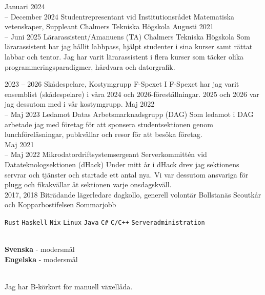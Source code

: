 \documentclass[9pt]{developercv}
\begin{document}
\begin{entrylist}
	\entry
		{Januari 2024 \\-- December 2024}
		{
			Studentrepresentant vid Institutionsrådet Matematiska\\vetenskaper, Suppleant
		}
		{Chalmers Tekniska Högskola}
		{}
	\entry
		{Augusti 2021 \\--  Juni 2025}
		{Lärarassistent/Amanuens (TA)}
		{Chalmers Tekniska Högskola}
		{
			Som lärarassistent har jag hållit labbpass, hjälpt studenter
			i sina kurser samt rättat labbar och tentor. Jag har varit
			lärarassistent i flera kurser som täcker olika
			programmeringsparadigmer, hårdvara och datorgrafik.\\
		}
\end{entrylist}

\begin{entrylist}
	\entry
		{2023 -- 2026}
		{Skådespelare, Kostymgrupp}
		{F-Spexet}
		{
			I F-Spexet har jag varit ensemblist (skådespelare) i
			våra 2024 och 2026-föreställningar. 2025 och 2026
			var jag dessutom med i vår kostymgrupp.
		}
	\entry
		{Maj 2022 \\-- Maj 2023}
		{Ledamot}
		{Datas Arbetsmarknadsgrupp (DAG)}
		{
			Som ledamot i DAG arbetade jag med företag för att
			sponsera studentsektionen genom lunchföreläsningar,
			pubkvällar och resor för att besöka företag.\\
		}
	\entry
		{Maj 2021 \\-- Maj 2022}
		{Mikrodatordriftsystemsergeant}
		{Serverkommittén vid Datateknologsektionen (dHack)}
		{
			Under mitt år i dHack drev jag sektionens
			servrar och tjänster och startade ett antal
			nya. Vi var dessutom ansvariga för plugg och
			fikakvällar åt sektionen varje onsdagskväll.\\
		}
	\entry
		{2017, 2018}
		{Biträdande lägerledare dagkollo, generell volontär}
		{Bollstanäs Scoutkår och Kopparbostifelsen}
		{Sommarjobb}
\end{entrylist}

\begin{minipage}[t]{0.3\textwidth}
	\vspace{-\baselineskip}
		{
			\texttt{Rust}\slashsep
			\texttt{Haskell}\slashsep
			\texttt{Nix}\slashsep
			\texttt{Linux}\slashsep
			\texttt{Java}\slashsep
			\texttt{C\#}\slashsep
			\texttt{C/C++}\slashsep
			\texttt{Serveradministration}
		}
\end{minipage}
\hfill
\begin{minipage}[t]{0.3\textwidth}
	\vspace{-\baselineskip}
	\\
	\textbf{Svenska} - modersmål\\
	\textbf{Engelska} - modersmål
\end{minipage}
\hfill
\begin{minipage}[t]{0.3\textwidth}
	\vspace{-\baselineskip}
	\\Jag har B-körkort för manuell växellåda.
\end{minipage}
\end{document}
